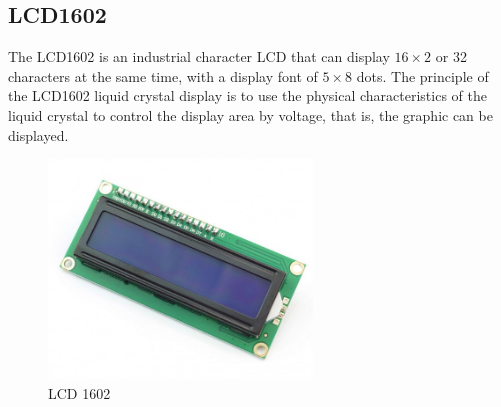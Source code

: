 \documentclass[a4paper, 12pt]{article}
\begin{document}
\newpage

\subsection{LCD1602}
The LCD1602\cite{lcd, i2cLcd} is an industrial character LCD that can display $16 \times 2$ or 32 characters at the same time, with a display font of $5 \times 8$ dots. The principle of the LCD1602 liquid crystal display is to use the physical characteristics of the liquid crystal to control the display area by voltage,
that is, the graphic can be displayed.
\begin{figure}[h]
    \includegraphics[width=7cm]{lcd}
    \centering
    \caption{LCD 1602}
\end{figure}
\end{document}
